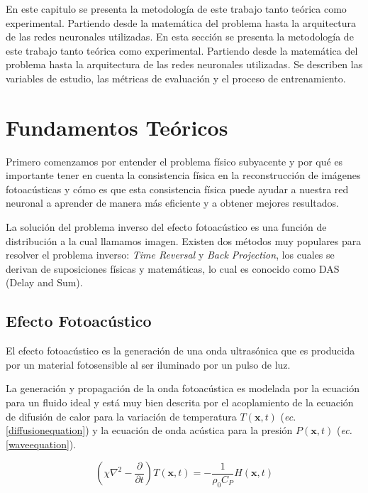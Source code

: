 En este capitulo se presenta la metodología de este trabajo tanto teórica como experimental. Partiendo desde la matemática del problema hasta la arquitectura de las redes neuronales utilizadas. En esta sección se presenta la metodología de este trabajo tanto teórica como experimental. Partiendo desde la matemática del problema hasta la arquitectura de las redes neuronales utilizadas. Se describen las variables de estudio, las métricas de evaluación y el proceso de entrenamiento.

\section{Fundamentos Teóricos} \label{sec:fundamentos}

Primero comenzamos por entender el problema físico subyacente y por qué es importante tener en cuenta la consistencia física en la reconstrucción de imágenes fotoacústicas y cómo es que esta consistencia física puede ayudar a nuestra red neuronal a aprender de manera más eficiente y a obtener mejores resultados.

La solución del problema inverso del efecto fotoacústico es una función de distribución a la cual llamamos imagen. Existen dos métodos muy populares para resolver el problema inverso: \textit{Time Reversal} y \textit{Back Projection}, los cuales se derivan de suposiciones físicas y matemáticas, lo cual es conocido como DAS (Delay and Sum).

\subsection{Efecto Fotoacústico}

El efecto fotoacústico es la generación de una onda ultrasónica que es producida por un material fotosensible al ser iluminado por un pulso de luz. 

La generación y propagación de la onda fotoacústica es modelada por la ecuación para un fluido ideal y está muy bien descrita por el acoplamiento de la ecuación de difusión de calor para la variación de temperatura $T(\mathbf{x}, t)$ (\textit{ec}. \ref{diffusionequation}) y la ecuación de onda acústica para la presión $P(\mathbf{x}, t)$ (\textit{ec.} \ref{waveequation}).

\begin{equation}
    (\chi \nabla^2  - \frac{\partial}{\partial t})T(\mathbf{x}, t) = - \frac{1}{\rho_{0}C_{P}}H(\mathbf{x}, t)
    \label{diffusionequation}
\end{equation}

